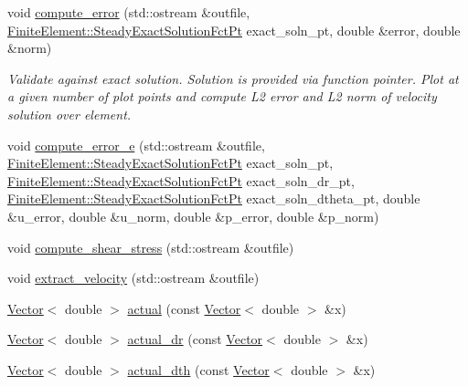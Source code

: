 \begin{DoxyCompactItemize}
void \hyperlink{classoomph_1_1SphericalNavierStokesEquations_a8904427521c872ffb9ce8109044ba7ff}{compute\+\_\+error} (std\+::ostream \&outfile, \hyperlink{classoomph_1_1FiniteElement_a690fd33af26cc3e84f39bba6d5a85202}{Finite\+Element\+::\+Steady\+Exact\+Solution\+Fct\+Pt} exact\+\_\+soln\+\_\+pt, double \&error, double \&norm)
\begin{DoxyCompactList}\small\item\em Validate against exact solution. Solution is provided via function pointer. Plot at a given number of plot points and compute L2 error and L2 norm of velocity solution over element. \end{DoxyCompactList}\item 
void \hyperlink{classoomph_1_1SphericalNavierStokesEquations_a18ac628bb3e32faa0a24182159fd7cea}{compute\+\_\+error\+\_\+e} (std\+::ostream \&outfile, \hyperlink{classoomph_1_1FiniteElement_a690fd33af26cc3e84f39bba6d5a85202}{Finite\+Element\+::\+Steady\+Exact\+Solution\+Fct\+Pt} exact\+\_\+soln\+\_\+pt, \hyperlink{classoomph_1_1FiniteElement_a690fd33af26cc3e84f39bba6d5a85202}{Finite\+Element\+::\+Steady\+Exact\+Solution\+Fct\+Pt} exact\+\_\+soln\+\_\+dr\+\_\+pt, \hyperlink{classoomph_1_1FiniteElement_a690fd33af26cc3e84f39bba6d5a85202}{Finite\+Element\+::\+Steady\+Exact\+Solution\+Fct\+Pt} exact\+\_\+soln\+\_\+dtheta\+\_\+pt, double \&u\+\_\+error, double \&u\+\_\+norm, double \&p\+\_\+error, double \&p\+\_\+norm)
\item 
void \hyperlink{classoomph_1_1SphericalNavierStokesEquations_a9a3bcc802ec26bc110d1f16d4f88d966}{compute\+\_\+shear\+\_\+stress} (std\+::ostream \&outfile)
\item 
void \hyperlink{classoomph_1_1SphericalNavierStokesEquations_ae0e2fd028424f6d2c86a903ddc852485}{extract\+\_\+velocity} (std\+::ostream \&outfile)
\item 
\hyperlink{classoomph_1_1Vector}{Vector}$<$ double $>$ \hyperlink{classoomph_1_1SphericalNavierStokesEquations_afefe6d1cb0f2c3790b4189ef6743486c}{actual} (const \hyperlink{classoomph_1_1Vector}{Vector}$<$ double $>$ \&x)
\item 
\hyperlink{classoomph_1_1Vector}{Vector}$<$ double $>$ \hyperlink{classoomph_1_1SphericalNavierStokesEquations_a7e45e6a6b85ad039a022c369363c4b70}{actual\+\_\+dr} (const \hyperlink{classoomph_1_1Vector}{Vector}$<$ double $>$ \&x)
\item 
\hyperlink{classoomph_1_1Vector}{Vector}$<$ double $>$ \hyperlink{classoomph_1_1SphericalNavierStokesEquations_ac4b121994e36314a10bafa55eb61fc09}{actual\+\_\+dth} (const \hyperlink{classoomph_1_1Vector}{Vector}$<$ double $>$ \&x)

\end{DoxyCompactItemize}

